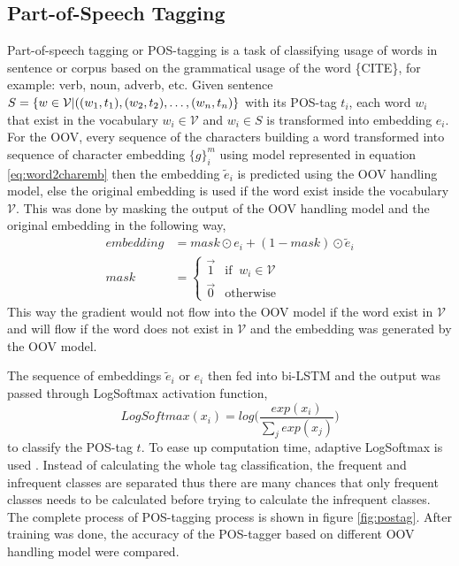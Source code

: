     \subsection{Part-of-Speech Tagging}
        Part-of-speech tagging or POS-tagging is a task of classifying
        usage of words in sentence or corpus based on the grammatical
        usage of the word \{CITE\}, for example: verb, noun, adverb,
        etc. Given sentence $S = \{w \in \mathcal{V} \vert ((w_1,
        t_1), (w_2, t_2)\\, \dots, (w_n, t_n)\}$ with its POS-tag
        $t_i$, each word $w_i$ that exist in the vocabulary $w_i \in
        \mathcal{V}$ and $w_i \in S$ is transformed into embedding
        $e_i$. For the OOV, every sequence of the characters building
        a word transformed into sequence of character embedding
        $\{g\}_{i}^m$ using model represented in equation
        \ref{eq:word2charemb} then the embedding $\tilde{e}_i$ is
        predicted using the OOV handling model, else the original
        embedding is used if the word exist inside the vocabulary
        $\mathcal{V}$. This was done by masking the output of the OOV
        handling model and the original embedding in the following
        way,
        \begin{align}
            \label{eq:embeddingmask}
            embedding &= mask \odot e_i + (1-mask) \odot \tilde{e}_i\\
            mask &=
            \begin{cases}
                \vec{1} & \text{if }\ w_i \in \mathcal{V}\\
                \vec{0} & \text{otherwise}
            \end{cases}
        \end{align}        
        This way the gradient would not flow into the OOV model if the
        word exist in $\mathcal{V}$ and will flow if the word does not
        exist in $\mathcal{V}$ and the embedding was generated by the
        OOV model.

        The sequence of embeddings $\tilde{e}_i$ or $e_i$ then fed
        into bi-LSTM and the output was passed through LogSoftmax
        activation function,
        \begin{equation}
            \label{eq:logsoftmax}
            LogSoftmax(x_i) = log \Bigg(\frac{exp(x_i)}{\sum_j exp(x_j)}\Bigg)
        \end{equation}
        to classify the POS-tag $t$. To ease up computation time,
        adaptive LogSoftmax is used \citep{grave2018efficientsoftmax}.
        Instead of calculating the whole tag classification, the
        frequent and infrequent classes are separated thus there are
        many chances that only frequent classes needs to be calculated
        before trying to calculate the infrequent classes. The
        complete process of POS-tagging process is shown in figure
        \ref{fig:postag}. After training was done, the accuracy of the
        POS-tagger based on different OOV handling model were
        compared.

